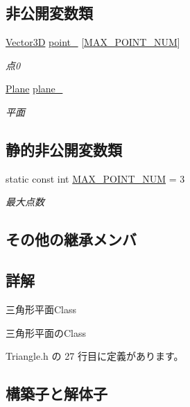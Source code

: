 \subsection*{非公開変数類}
\begin{DoxyCompactItemize}
\item 
\mbox{\hyperlink{class_vector3_d}{Vector3D}} \mbox{\hyperlink{class_triangle_a0ade12967df7d4c69d4b3841e59fd3c0}{point\+\_\+}} \mbox{[}\mbox{\hyperlink{class_triangle_aa79a559da8bd7104052922b6c8c40287}{M\+A\+X\+\_\+\+P\+O\+I\+N\+T\+\_\+\+N\+UM}}\mbox{]}
\begin{DoxyCompactList}\small\item\em 点0 \end{DoxyCompactList}\item 
\mbox{\hyperlink{class_plane}{Plane}} \mbox{\hyperlink{class_triangle_a93586199c2c173771f2e167f477eaa70}{plane\+\_\+}}
\begin{DoxyCompactList}\small\item\em 平面 \end{DoxyCompactList}\end{DoxyCompactItemize}
\subsection*{静的非公開変数類}
\begin{DoxyCompactItemize}
\item 
static const int \mbox{\hyperlink{class_triangle_aa79a559da8bd7104052922b6c8c40287}{M\+A\+X\+\_\+\+P\+O\+I\+N\+T\+\_\+\+N\+UM}} = 3
\begin{DoxyCompactList}\small\item\em 最大点数 \end{DoxyCompactList}\end{DoxyCompactItemize}
\subsection*{その他の継承メンバ}


\subsection{詳解}
三角形平面\+Class 

三角形平面の\+Class 

 Triangle.\+h の 27 行目に定義があります。



\subsection{構築子と解体子}
\mbox{\label{class_triangle_a5199760a17454f4dc94c855a57e3a152}} 
